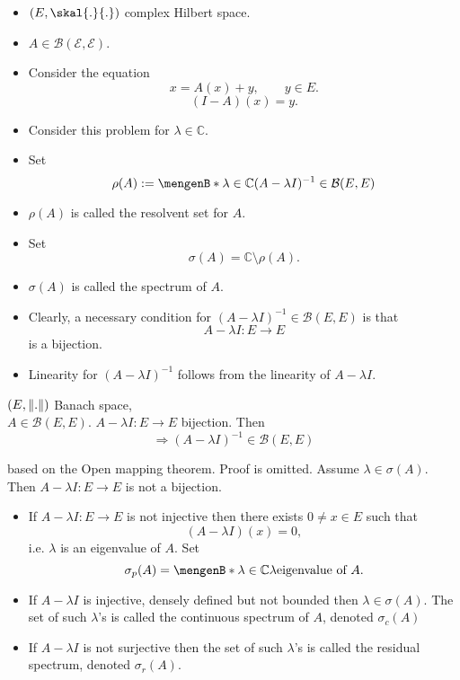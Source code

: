 \begin{itemize}
	\item $(E,\skal{.}{.})$ complex Hilbert space.
	\item $A \in \mathcal{B(E,E)}$. 
	\item Consider the equation
\[
	x = A(x)+ y, \qquad y \in E.
\]
\[
	(I-A)(x)= y.
\]
\item Consider this problem for $\lambda \in \mathbb{C}$. \\
\item Set \[
	\rho(A) := \set[\lambda \in \mathbb{C}]{(A- \lambda I)^{-1} \in \mathcal{B}(E,E)}
\]
\item $\rho(A)$ is called the resolvent set for $A$.
\item Set \[
	\sigma(A) = \mathbb{C} \setminus \rho(A).
\]
\item $\sigma(A)$ is called the spectrum of $A$.
\item Clearly, a necessary condition for $(A-\lambda I)^{-1} \in \mathcal{B}(E,E)$ is that 
\[
	A - \lambda I:E \to E
\]
is a bijection.
\item Linearity for $(A-\lambda I)^{-1}$ follows from the linearity of $A-\lambda I$.

\end{itemize}
\begin{theorem}
	$(E,\norm{.})$ Banach space, \\ $A \in \mathcal{B}(E,E)$. $A-\lambda I: E \to E$ bijection. Then
	\[
		\Rightarrow (A- \lambda I)^{-1} \in \mathcal{B}(E,E)
	\]
\end{theorem}
\begin{beweis}
	based on the Open mapping theorem. Proof is omitted. Assume $\lambda \in \sigma(A)$. Then $A-\lambda I:E \to E$ is not a bijection.

\begin{itemize}
	\item If $A-\lambda I: E \to E$ is not injective then there exists $0 \neq x \in  E $ such that
	\[
		(A- \lambda I)(x) = 0,
	\]
	i.e. $\lambda$ is an eigenvalue of $A$.
	Set	
	\[
		\sigma_p(A) = \set[\lambda \in \mathbb{C}]{\lambda \text{eigenvalue of $A$}}.
	\]
	\item If $A-\lambda I$ is injective, densely defined but not bounded then $\lambda \in \sigma(A)$. The set of such $\lambda$'s is called the continuous spectrum of $A$, denoted $\sigma_c(A)$
	\item If $A-\lambda I$ is not surjective then the set of such $\lambda$'s is called the residual spectrum, denoted $\sigma _r(A)$.
\end{itemize}
\end{beweis}
